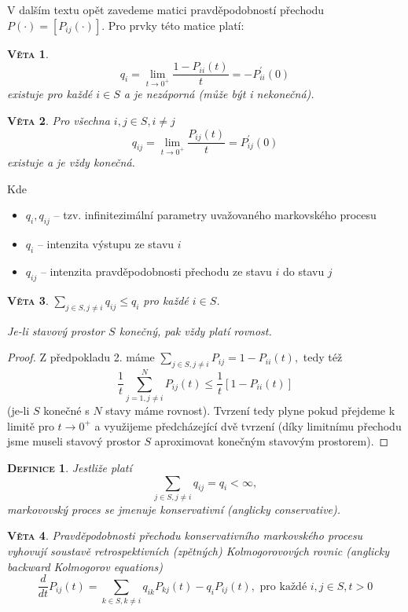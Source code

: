 \documentclass[10pt]{article}
\newtheorem{mydef}{\textsc{Definice}}
\newtheorem{proposition}{\textsc{Věta}}
\begin{document}
V dalším textu opět zavedeme matici pravděpodobností přechodu $P(\cdot) = [P_{ij}(\cdot)]$. Pro prvky této matice platí:
\begin{proposition}
$$q_i=\lim_{t \to 0^+} \frac{1-P_{ii}(t)}{t} = -P^\prime_{ii}(0)$$ existuje pro každé $i \in S$ a je nezáporná (může být i nekonečná).
\end{proposition}
\begin{proposition}
Pro všechna $i,j\in S, i \neq j$ $$q_{ij} = \lim_{t \to 0^+} \frac{P_{ij}(t)}{t} = P^\prime_{ij}(0)$$ existuje a je vždy konečná.
\end{proposition}

Kde 
\begin{itemize}
\item $q_i,q_{ij}$ -- tzv. infinitezimální parametry uvažovaného markovského procesu
\item $q_i$ -- intenzita výstupu ze stavu $i$
\item $q_{ij}$ -- intenzita pravděpodobnosti přechodu ze stavu $i$ do stavu $j$
\end{itemize}
\begin{proposition}
$\sum_{j \in S, j \neq i} q_{ij} \leq q_i$ pro každé $i \in S$.

Je-li stavový prostor $S$ konečný, pak vždy platí rovnost.
\end{proposition}

\begin{proof}
Z předpokladu 2. máme $\sum_{j \in S, j \neq i} P_{ij} = 1-P_{ii}(t),$ tedy též $$\frac{1}{t} \sum_{j=1,j \neq i}^{N} P_{ij}(t) \leq \frac{1}{t}[1-P_{ii}(t)]$$ (je-li $S$ konečné s $N$ stavy máme rovnost). Tvrzení tedy plyne pokud přejdeme k limitě pro $t \to 0^+$ a využijeme předcházející dvě tvrzení (díky limitnímu přechodu jsme museli stavový prostor $S$ aproximovat konečným stavovým prostorem).
\end{proof}

\begin{mydef}
Jestliže platí $$\sum_{j \in S, j \neq i} q_{ij} = q_i < \infty,$$ markovovský proces se jmenuje konservativní (anglicky conservative).
\end{mydef}

\begin{proposition}
Pravděpodobnosti přechodu konservativního markovského procesu vyhovují soustavě retrospektivních (zpětných) Kolmogorovových rovnic (anglicky backward Kolmogorov equations)
\begin{equation}
\frac{d}{dt}P_{ij}(t) = \sum_{k \in S, k \neq i} q_{ik}P_{kj}(t)-q_iP_{ij}(t), \text{ pro každé }i,j \in S, t>0
\end{equation}
\end{proposition}
\end{document}
